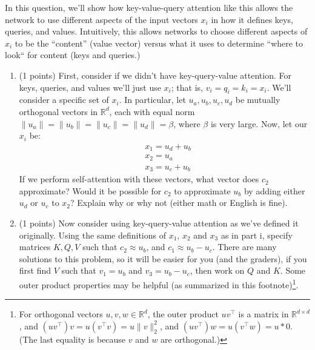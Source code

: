 \begin{enumerate}[(a)]
In this question, we'll show how key-value-query attention like this allows the network to use different aspects of the input vectors $x_i$ in how it defines keys, queries, and values.
Intuitively, this allows networks to choose different aspects of $x_i$ to be the ``content'' (value vector) versus what it uses to determine ``where to look`` for content (keys and queries.)

    \begin{enumerate}
    \item (1 points) First, consider if we didn't have key-query-value attention. For keys, queries, and values we'll just use $x_i$; that is, $v_i=q_i=k_i=x_i$.
    We'll consider a specific set of $x_i$. In particular, let $u_a,u_b,u_c,u_d$ be mutually orthogonal vectors in $\mathbb{R}^d$, each with equal norm $\|u_a\|=\|u_b\|=\|u_c\|=\|u_d\|=\beta$, where $\beta$ is very large. 
    Now, let our $x_i$ be:
    \begin{align}
    &x_1 = u_d + u_b\\
    &x_2 = u_a \\
    &x_3 = u_c + u_b
    \end{align}
    If we perform self-attention with these vectors, what vector does $c_2$ approximate?
    Would it be possible for $c_2$ to approximate $u_b$ by adding either $u_d$ or $u_c$ to $x_2$? Explain why or why not (either math or English is fine).

    \begin{answer}
    \end{answer}


    \item (1 points) Now consider using key-query-value attention as we've defined it originally. Using the same definitions of $x_1$, $x_2$ and $x_3$ as in part i, specify matrices $K,Q,V$ such that $c_2 \approx u_b$, and $c_1\approx u_b - u_c$. There are many solutions to this problem, so it will be easier for you (and the graders), if you first find $V$ such that $v_1 = u_b$ and $v_3 = u_b - u_c$, then work on $Q$ and $K$. Some outer product properties may be helpful (as summarized in this footnote)\footnote{For orthogonal vectors $u,v,w\in\mathbb{R}^d$, the outer product $uv^\top$ is a matrix in $\mathbb{R}^{d\times d}$, and $(uv^\top)v = u(v^\top v)=u\|v\|_2^2$, and $(uv^\top)w = u(v^\top w)=u*0$. (The last equality is because $v$ and $w$ are orthogonal.)}.

    \begin{answer}
    \end{answer}


    \end{enumerate}



\end{enumerate}
